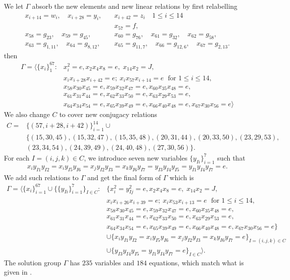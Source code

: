 \documentclass[11pt,letterpaper]{article}
\newcommand{\1}{\mathbb{1}}
\theoremstyle{definition}
\begin{document}
We let $\Gamma$ absorb the new elements and new linear relations by first relabelling
\begin{align*}
	x_{i+14} = w_i, \quad x_{i+28} = y_i,\quad &x_{i+42} = z_i\quad 1 \leq i \leq 14\\
	&x_{57} = f,\\
	x_{58} = g_{23},\quad x_{59} = g_{45},\quad &x_{60} = g_{76},\quad x_{61} = g_{32},\quad x_{62} = g_{58},\\
	x_{63} = g_{1,11},\quad x_{64} =g_{8,12},\quad &x_{65} = g_{11,7},\quad x_{66} =g_{12,6},\quad x_{67} = g_{2,13}.
\end{align*}
then
\begin{align*}
	\Gamma = \langle \{x_i\}_1^{67} :&x_i^2 = e, x_2x_4x_8 = e,\; x_{14}x_{2} = J,\\
	&x_ix_{i+28}x_{i+42} =e;\ x_ix_{57}x_{i+14} =e\;\text{ for } 1 \leq i \leq 14,\\
	&x_{58}x_{30}x_{45} = e,
	x_{59}x_{32}x_{47} = e,
	x_{60}x_{35}x_{48} = e,\\
	&x_{61}x_{31}x_{44} = e,
	x_{62}x_{33}x_{50} = e,
	x_{63}x_{29}x_{53} = e,\\
	&x_{64}x_{34}x_{54} = e,
	x_{65}x_{39}x_{49} = e,
	x_{66}x_{40}x_{48} = e,
	x_{67}x_{30}x_{56} = e\rangle
\end{align*}
We also change $C$ to cover new conjugacy relations
\begin{align*}
	C = &\{(57, i+28, i+42)\}_{i=1}^{14} \cup\\
	 &\{(15,30,45),(15,32,47),(15,35,48),(20,31,44),(20,33,50),(23,29,53),\\
	 &(23, 34, 54),(24,39,49),(24,40,48),(27,30,56)\}.
\end{align*}
For each $I = (i,j,k) \in C$, we introduce seven new variables $\{y_{Ii}\}_{i=1}^7$ such that 
\begin{align*}
	x_iy_{I1}y_{I2} = x_iy_{I5}y_{I6} =x_jy_{I2}y_{I3}=x_ky_{I6}y_{I7}=y_{I3}y_{I4}y_{I5}=y_{I1}y_{I4}y_{I7}=e.
\end{align*}
We add such relations to $\Gamma$ and get the final form of $\Gamma$ which is
\begin{equation}
	\begin{split}
	\Gamma = \langle \{x_i\}_{i=1}^{67}\cup\{\{y_{Ii}\}_{i=1}^7\}_{I \in C} :&\{x_i^2 = y_{Ij}^2=e, x_2x_4x_8 = e,\; x_{14}x_{2} = J,\\
	&x_ix_{i+26}x_{i+39} =e;\ x_ix_{53}x_{i+13} =e\;\text{ for } 1 \leq i \leq 14,\\
	&x_{58}x_{30}x_{45} = e,
	x_{59}x_{32}x_{47} = e,
	x_{60}x_{35}x_{48} = e,\\
	&x_{61}x_{31}x_{44} = e,
	x_{62}x_{33}x_{50} = e,
	x_{63}x_{29}x_{53} = e,\\
	&x_{64}x_{34}x_{54} = e,
	x_{65}x_{39}x_{49} = e,
	x_{66}x_{40}x_{48} = e,
	x_{67}x_{30}x_{56} = e\}\\
	&\cup \{x_iy_{I1}y_{I2} = x_iy_{I5}y_{I6} =x_jy_{I2}y_{I3}=x_ky_{I6}y_{I7}=e\}_{I=(i,j,k) \in C} \\
	&\cup \{y_{I3}y_{I4}y_{I5}=y_{I1}y_{I4}y_{I7} =e\}_{I \in C}\rangle.
	\end{split}
\end{equation}
The solution group $\Gamma$ has $235$ variables and $184$ equations, which match what is given in
\cite{slofstra2017}.
\end{document}
